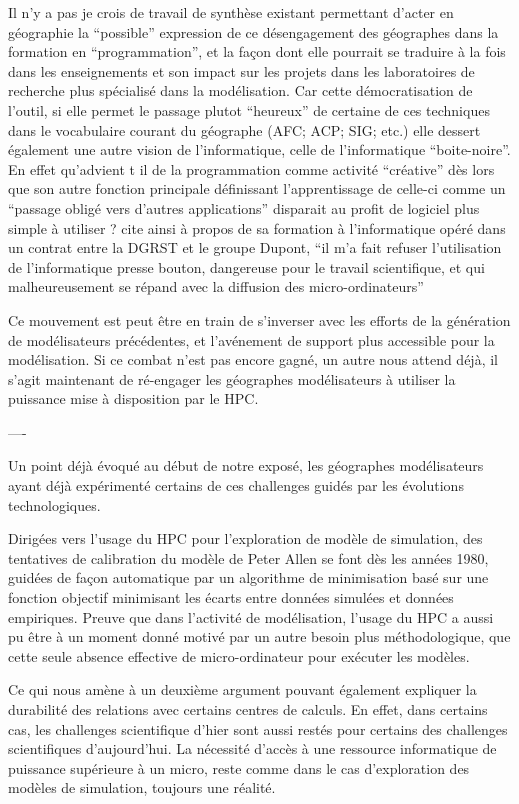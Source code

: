 Il n’y a pas je crois de travail de synthèse existant permettant d'acter en géographie la “possible” expression de ce désengagement des géographes dans la formation en “programmation”, et la façon dont elle pourrait se traduire à la fois dans les enseignements et son impact sur les projets dans les laboratoires de recherche plus spécialisé dans la modélisation. Car cette démocratisation de l’outil, si elle permet le passage  plutot \enquote{heureux} de certaine de ces techniques dans le vocabulaire courant du géographe (AFC; ACP; SIG; etc.) \autocite{Pumain2002} elle dessert également une autre vision de l'informatique, celle de l'informatique \enquote{boite-noire}. En effet qu’advient t il de la programmation comme activité “créative” dès lors que son autre fonction principale définissant l’apprentissage de celle-ci comme un \enquote{passage obligé vers d’autres applications} disparait au profit de logiciel plus simple à utiliser ? \textcite[4]{LeBerre1987} cite ainsi à propos de sa formation à l’informatique opéré dans un contrat entre la DGRST et le groupe Dupont, \enquote{il m’a fait refuser l’utilisation de l’informatique presse bouton, dangereuse pour le travail scientifique, et qui malheureusement se répand avec la diffusion des micro-ordinateurs}

Ce mouvement est peut être en train de s'inverser avec les efforts de la génération de modélisateurs précédentes, et l'avénement de support plus accessible pour la modélisation. Si ce combat n'est pas encore gagné, un autre nous attend déjà, il s'agit maintenant de ré-engager les géographes modélisateurs à utiliser la puissance mise à disposition par le HPC.




----

Un point déjà évoqué au début de notre exposé, les géographes modélisateurs ayant déjà expérimenté certains de ces challenges guidés par les évolutions technologiques. 

Dirigées vers l'usage du HPC pour l'exploration de modèle de simulation, des tentatives de calibration du modèle de Peter Allen se font dès les années 1980, guidées de façon automatique par un algorithme de minimisation basé sur une fonction objectif minimisant les écarts entre données simulées et données empiriques. Preuve que dans l'activité de modélisation, l'usage du HPC a aussi pu être à un moment donné motivé par un autre besoin plus méthodologique, que cette seule absence effective de micro-ordinateur pour exécuter les modèles.

Ce qui nous amène à un deuxième argument pouvant également expliquer la durabilité des relations avec certains centres de calculs. En effet, dans certains cas, les challenges scientifique d'hier sont aussi restés pour certains des challenges scientifiques d'aujourd'hui. La nécessité d'accès à une ressource informatique de puissance supérieure à un micro, reste comme dans le cas d'exploration des modèles de simulation, toujours une réalité.



